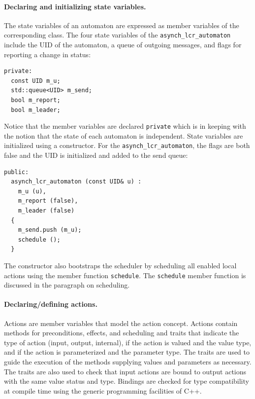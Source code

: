 \paragraph{Declaring and initializing state variables.}
The state variables of an automaton are expressed as member variables of the corresponding class.
The four state variables of the \verb+asynch_lcr_automaton+ include the UID of the automaton, a queue of outgoing messages, and flags for reporting a change in status:
\begin{lstlisting}
private:
  const UID m_u;
  std::queue<UID> m_send;
  bool m_report;
  bool m_leader;
\end{lstlisting}
Notice that the member variables are declared \verb+private+ which is in keeping with the notion that the state of each automaton is independent.
State variables are initialized using a constructor.
For the \verb+asynch_lcr_automaton+, the flags are both false and the UID is initialized and added to the send queue:
\begin{lstlisting}
public:
  asynch_lcr_automaton (const UID& u) :
    m_u (u),
    m_report (false),
    m_leader (false)
  {
    m_send.push (m_u);
    schedule ();
  }
\end{lstlisting}
The constructor also bootstraps the scheduler by scheduling all enabled local actions using the member function \verb+schedule+.
The \verb+schedule+ member function is discussed in the paragraph on scheduling.

\paragraph{Declaring/defining actions.}
Actions are member variables that model the action concept.
Actions contain methods for preconditions, effects, and scheduling and traits that indicate the type of action (input, output, internal), if the action is valued and the value type, and if the action is parameterized and the parameter type.
The traits are used to guide the execution of the methods supplying values and parameters as necessary.
The traits are also used to check that input actions are bound to output actions with the same value status and type.
Bindings are checked for type compatibility at compile time using the generic programming facilities of C++.

